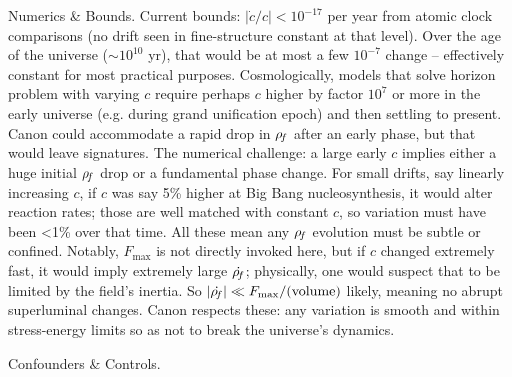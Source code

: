 \documentclass[11pt]{article}
\begin{document}
Numerics & Bounds. Current bounds: $|\dot{c}/c| < 10^{-17}$ per year from atomic clock comparisons (no drift seen in fine-structure constant at that level). Over the age of the universe ($\sim 10^{10}$ yr), that would be at most a few $10^{-7}$ change – effectively constant for most practical purposes. Cosmologically, models that solve horizon problem with varying $c$ require perhaps $c$ higher by factor $10^7$ or more in the early universe (e.g. during grand unification epoch) and then settling to present. Canon could accommodate a rapid drop in $\rho_{\!f}$ after an early phase, but that would leave signatures. The numerical challenge: a large early $c$ implies either a huge initial $\rho_{\!f}$ drop or a fundamental phase change. For small drifts, say linearly increasing $c$, if $c$ was say 5\% higher at Big Bang nucleosynthesis, it would alter reaction rates; those are well matched with constant $c$, so variation must have been <1\% over that time. All these mean any $\rho_{\!f}$ evolution must be subtle or confined. Notably, $F_{\max}$ is not directly invoked here, but if $c$ changed extremely fast, it would imply extremely large $\dot{\rho_{\!f}}$; physically, one would suspect that to be limited by the field’s inertia. So $|\dot{\rho_{\!f}}| \ll F_{\max}/\text{(volume)}$ likely, meaning no abrupt superluminal changes. Canon respects these: any variation is smooth and within stress-energy limits so as not to break the universe’s dynamics.


Confounders & Controls.
\end{document}
